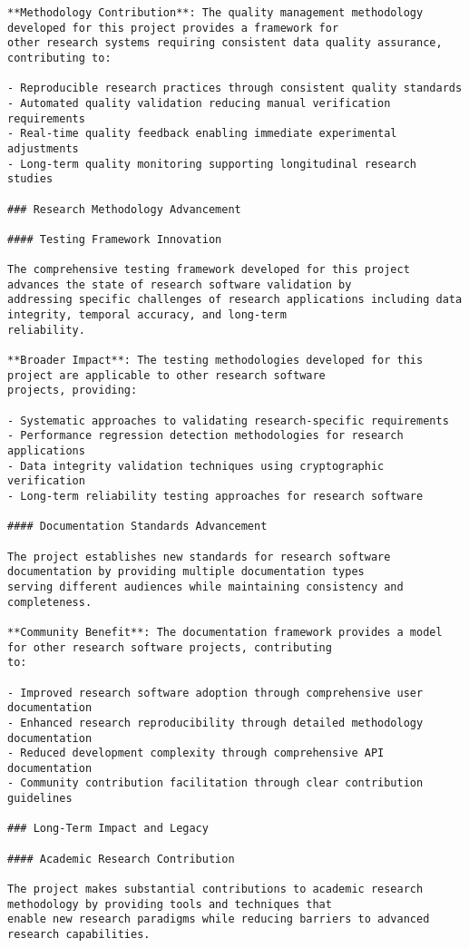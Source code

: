 \documentclass[11pt,a4paper]{report}
\begin{document}
\begin{verbatim}
**Methodology Contribution**: The quality management methodology developed for this project provides a framework for
other research systems requiring consistent data quality assurance, contributing to:

- Reproducible research practices through consistent quality standards
- Automated quality validation reducing manual verification requirements
- Real-time quality feedback enabling immediate experimental adjustments
- Long-term quality monitoring supporting longitudinal research studies

### Research Methodology Advancement

#### Testing Framework Innovation

The comprehensive testing framework developed for this project advances the state of research software validation by
addressing specific challenges of research applications including data integrity, temporal accuracy, and long-term
reliability.

**Broader Impact**: The testing methodologies developed for this project are applicable to other research software
projects, providing:

- Systematic approaches to validating research-specific requirements
- Performance regression detection methodologies for research applications
- Data integrity validation techniques using cryptographic verification
- Long-term reliability testing approaches for research software

#### Documentation Standards Advancement

The project establishes new standards for research software documentation by providing multiple documentation types
serving different audiences while maintaining consistency and completeness.

**Community Benefit**: The documentation framework provides a model for other research software projects, contributing
to:

- Improved research software adoption through comprehensive user documentation
- Enhanced research reproducibility through detailed methodology documentation
- Reduced development complexity through comprehensive API documentation
- Community contribution facilitation through clear contribution guidelines

### Long-Term Impact and Legacy

#### Academic Research Contribution

The project makes substantial contributions to academic research methodology by providing tools and techniques that
enable new research paradigms while reducing barriers to advanced research capabilities.


\end{verbatim}
\end{document}
